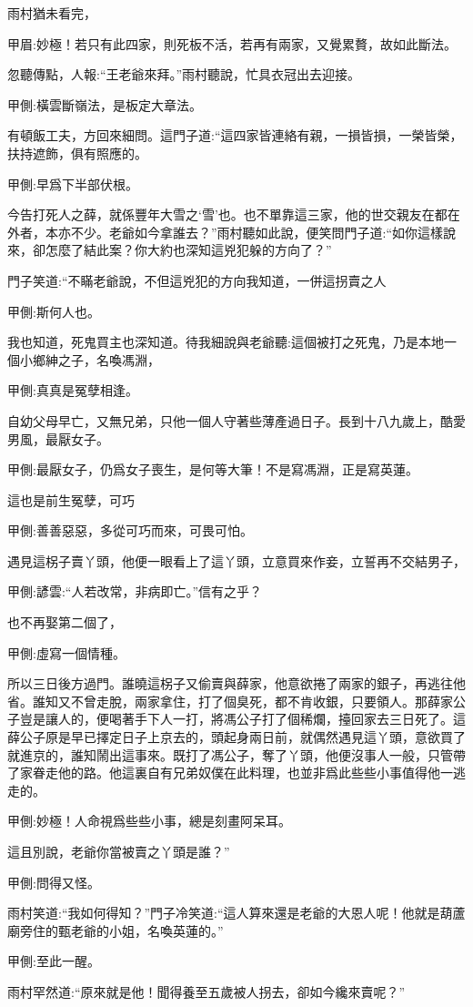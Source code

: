 \begin{parag}
    雨村猶未看完，\begin{note}甲眉:妙極！若只有此四家，則死板不活，若再有兩家，又覺累贅，故如此斷法。\end{note}忽聽傳點，人報:“王老爺來拜。”雨村聽說，忙具衣冠出去迎接。\begin{note}甲側:橫雲斷嶺法，是板定大章法。\end{note}有頓飯工夫，方回來細問。這門子道:“這四家皆連絡有親，一損皆損，一榮皆榮，扶持遮飾，俱有照應的。\begin{note}甲側:早爲下半部伏根。\end{note}今告打死人之薛，就係豐年大雪之‘雪’也。也不單靠這三家，他的世交親友在都在外者，本亦不少。老爺如今拿誰去？”雨村聽如此說，便笑問門子道:“如你這樣說來，卻怎麼了結此案？你大約也深知這兇犯躲的方向了？”
\end{parag}


\begin{parag}
    門子笑道:“不瞞老爺說，不但這兇犯的方向我知道，一併這拐賣之人\begin{note}甲側:斯何人也。\end{note}我也知道，死鬼買主也深知道。待我細說與老爺聽:這個被打之死鬼，乃是本地一個小鄉紳之子，名喚馮淵，\begin{note}甲側:真真是冤孽相逢。\end{note}自幼父母早亡，又無兄弟，只他一個人守著些薄產過日子。長到十八九歲上，酷愛男風，最厭女子。\begin{note}甲側:最厭女子，仍爲女子喪生，是何等大筆！不是寫馮淵，正是寫英蓮。\end{note}這也是前生冤孽，可巧\begin{note}甲側:善善惡惡，多從可巧而來，可畏可怕。\end{note}遇見這柺子賣丫頭，他便一眼看上了這丫頭，立意買來作妾，立誓再不交結男子，\begin{note}甲側:諺雲:“人若改常，非病即亡。”信有之乎？\end{note}也不再娶第二個了，\begin{note}甲側:虛寫一個情種。\end{note}所以三日後方過門。誰曉這柺子又偷賣與薛家，他意欲捲了兩家的銀子，再逃往他省。誰知又不曾走脫，兩家拿住，打了個臭死，都不肯收銀，只要領人。那薛家公子豈是讓人的，便喝著手下人一打，將馮公子打了個稀爛，擡回家去三日死了。這薛公子原是早已擇定日子上京去的，頭起身兩日前，就偶然遇見這丫頭，意欲買了就進京的，誰知鬧出這事來。既打了馮公子，奪了丫頭，他便沒事人一般，只管帶了家眷走他的路。他這裏自有兄弟奴僕在此料理，也並非爲此些些小事值得他一逃走的。\begin{note}甲側:妙極！人命視爲些些小事，總是刻畫阿呆耳。\end{note}這且別說，老爺你當被賣之丫頭是誰？”\begin{note}甲側:問得又怪。\end{note}雨村笑道:“我如何得知？”門子冷笑道:“這人算來還是老爺的大恩人呢！他就是葫蘆廟旁住的甄老爺的小姐，名喚英蓮的。”\begin{note}甲側:至此一醒。\end{note}雨村罕然道:“原來就是他！聞得養至五歲被人拐去，卻如今纔來賣呢？”
\end{parag}


